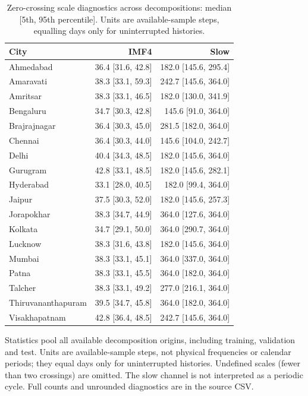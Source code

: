 \begin{table}[!htbp]
\centering
\caption{Zero-crossing scale diagnostics across decompositions: median [5th, 95th percentile]. Units are available-sample steps, equalling days only for uninterrupted histories.}\label{tab:periods1}
\setlength{\tabcolsep}{4pt}
\begin{tabular}{lrr}
\toprule
City & IMF4 & Slow \\
\midrule
Ahmedabad & 36.4 [31.6, 42.8] & 182.0 [145.6, 295.4] \\
Amaravati & 38.3 [33.1, 59.3] & 242.7 [145.6, 364.0] \\
Amritsar & 38.3 [33.1, 46.5] & 182.0 [130.0, 341.9] \\
Bengaluru & 34.7 [30.3, 42.8] & 145.6 [91.0, 364.0] \\
Brajrajnagar & 36.4 [30.3, 45.0] & 281.5 [182.0, 364.0] \\
Chennai & 36.4 [30.3, 44.0] & 145.6 [104.0, 242.7] \\
Delhi & 40.4 [34.3, 48.5] & 182.0 [145.6, 364.0] \\
Gurugram & 42.8 [33.1, 48.5] & 182.0 [145.6, 282.1] \\
Hyderabad & 33.1 [28.0, 40.5] & 182.0 [99.4, 364.0] \\
Jaipur & 37.5 [30.3, 52.0] & 182.0 [145.6, 257.3] \\
Jorapokhar & 38.3 [34.7, 44.9] & 364.0 [127.6, 364.0] \\
Kolkata & 34.7 [29.1, 50.0] & 364.0 [290.7, 364.0] \\
Lucknow & 38.3 [31.6, 43.8] & 182.0 [145.6, 364.0] \\
Mumbai & 38.3 [33.1, 45.1] & 364.0 [337.0, 364.0] \\
Patna & 38.3 [33.1, 45.5] & 364.0 [182.0, 364.0] \\
Talcher & 38.3 [33.1, 49.2] & 277.0 [216.1, 364.0] \\
Thiruvananthapuram & 39.5 [34.7, 45.8] & 364.0 [182.0, 364.0] \\
Visakhapatnam & 42.8 [36.4, 48.5] & 242.7 [145.6, 364.0] \\
\bottomrule
\end{tabular}
\par\smallskip\begin{minipage}{0.98\linewidth}\footnotesize Statistics pool all available decomposition origins, including training, validation and test. Units are available-sample steps, not physical frequencies or calendar periods; they equal days only for uninterrupted histories. Undefined scales (fewer than two crossings) are omitted. The slow channel is not interpreted as a periodic cycle. Full counts and unrounded diagnostics are in the source CSV.\end{minipage}
\end{table}

